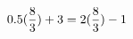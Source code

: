 \documentclass[preview]{standalone}
\begin{document}
\begin{align*}
\special{dvisvgm:raw <g id='unique000'>}0.5(\frac{8}{3})+3 = 2(\frac{8}{3})-1\special{dvisvgm:raw </g>}
\end{align*}
\end{document}
